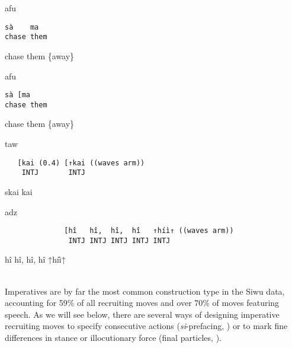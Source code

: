 \documentclass[output=paper]{langsci/langscibook}
\begin{document}
\vspace{2mm}
%
%
\begin{mdframednoverticalspace}[style=firstfoc]
\begin{transbox}{2}{afu}
\begin{verbatim}
sà    ma
chase them
\end{verbatim}
chase them \{away\}
\end{transbox}
\end{mdframednoverticalspace}
%
%
\begin{transbox}{4}{afu}
\begin{verbatim}
sà [ma
chase them
\end{verbatim}
chase them \{away\}
\end{transbox}
%
\begin{mdframednoverticalspace}[style=secondfoc]
\begin{transbox}{5}{taw}
\begin{verbatim}
   [kai (0.4) [↑kai ((waves arm))
    INTJ       INTJ
\end{verbatim}
\hspace{0.55cm} skai \hspace{1.05cm} kai
\end{transbox}
\end{mdframednoverticalspace}
%
\begin{mdframednoverticalspace}[style=secondfoc]
\begin{transbox}{6}{adz}
\begin{verbatim}
              [hî   hî,  hî,  hî   ↑híì↑ ((waves arm))
               INTJ INTJ INTJ INTJ INTJ
\end{verbatim}
\hspace{2.2cm} hî   hî,  hî,  hî   ↑híì↑
\end{transbox}
\end{mdframednoverticalspace}
%
\\

\normalsize
Imperatives are by far the most common construction type in the Siwu data, accounting for 59\% of all recruiting moves and over 70\% of moves featuring speech. As we will see below, there are several ways of designing imperative recruiting moves to specify consecutive actions (\textit{si}-prefacing, ) or to mark fine differences in stance or illocutionary force (final particles, ).
\end{document}
